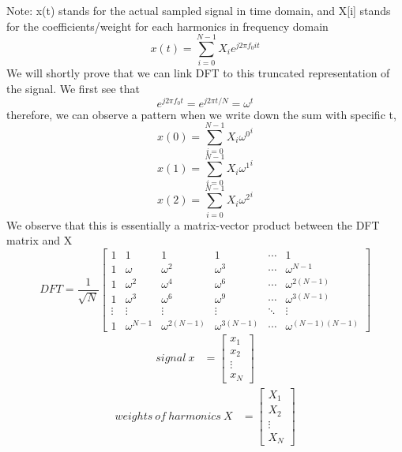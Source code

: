 \documentclass{article}
\begin{document}
Note: x(t) stands for the actual sampled signal in time domain, and X[i] stands for the coefficients/weight for each harmonics in frequency domain
   \begin{equation}
   	x(t)=\sum_{i=0}^{N-1} X_{i} e^{j2 \pi f_{0} i t}
   \end{equation} 
We will shortly prove that we can link DFT to this truncated representation of the signal. We first see that 
   \begin{equation}
   	e^{j2 \pi f_{0}  t} = e^{j2 \pi t / N} = {\omega^{t}}
   \end{equation} 
therefore, we can observe a pattern when we write down the sum with specific t,
 \begin{equation}
   	x(0) = \sum_{i=0}^{N-1} X_{i}  {{\omega^{0}}^{i}} 
   \end{equation} 
   \begin{equation}
   	x(1) = \sum_{i=0}^{N-1} X_{i}  {{\omega^{1}}^{i}}
   \end{equation} 
    \begin{equation}
   	x(2) = \sum_{i=0}^{N-1} X_{i}   {{\omega^{2}}^{i}} 
   \end{equation} 
We observe that this is essentially a matrix-vector product between the DFT matrix and X
\begin{equation}
DFT = \frac{1}{\sqrt{N}}\left[\begin{array}{cccccc}{1} & {1} & {1} & {1} & {\cdots} & {1} \\ {1} & {\omega} & {\omega^{2}} & {\omega^{3}} & {\cdots} & {\omega^{N-1}} \\ {1} & {\omega^{2}} & {\omega^{4}} & {\omega^{6}} & {\cdots} & {\omega^{2(N-1)}} \\ {1} & {\omega^{3}} & {\omega^{6}} & {\omega^{9}} & {\cdots} & {\omega^{3(N-1)}} \\ {\vdots} & {\vdots} & {\vdots} & {\vdots} & {\ddots} & {\vdots} \\ {1} & {\omega^{N-1}} & {\omega^{2(N-1)}} & {\omega^{3(N-1)}} & {\cdots} & {\omega^{(N-1)(N-1)}}\end{array}\right]
\end{equation}
\begin{align}
   	signal\: x &= \begin{bmatrix}
            x_{1} \\
            x_{2} \\
            \vdots \\
            x_{N}
         \end{bmatrix}
\end{align}
\begin{align}
   	weights\: of\: harmonics\: X &= \begin{bmatrix}
            X_{1} \\
            X_{2} \\
            \vdots \\
            X_{N}
         \end{bmatrix}
\end{align}
\end{document}
